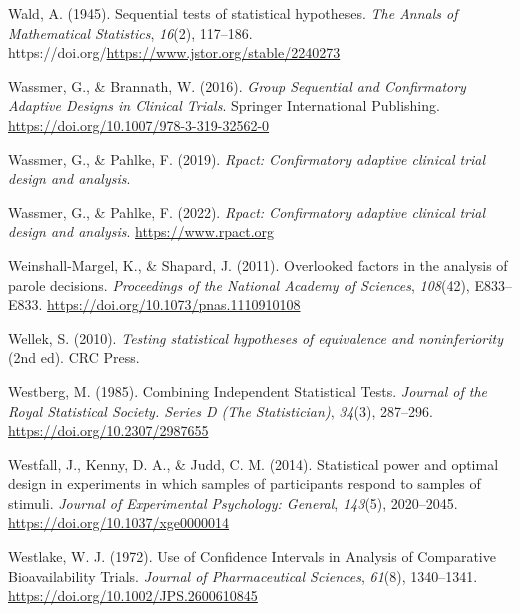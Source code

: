 \documentclass[
  oneside]{krantz}
\newlength{\cslhangindent}
\newlength{\cslentryspacingunit} %
\newenvironment{CSLReferences}[2] %
 {%
  \setlength{\parindent}{0pt}
  \ifodd #1
  \let\oldpar\par
  \def\par{\hangindent=\cslhangindent\oldpar}
  \fi
  \setlength{\parskip}{#2\cslentryspacingunit}
 }%
 {}
\begin{document}
\begin{CSLReferences}{1}{0}
\leavevmode{}%
Wald, A. (1945). Sequential tests of statistical hypotheses. \emph{The
Annals of Mathematical Statistics}, \emph{16}(2), 117--186.
https://doi.org/\url{https://www.jstor.org/stable/2240273}

\leavevmode{}%
Wassmer, G., \& Brannath, W. (2016). \emph{Group {Sequential} and
{Confirmatory Adaptive Designs} in {Clinical Trials}}. {Springer
International Publishing}.
\url{https://doi.org/10.1007/978-3-319-32562-0}

\leavevmode{}%
Wassmer, G., \& Pahlke, F. (2019). \emph{Rpact: {Confirmatory} adaptive
clinical trial design and analysis}.

\leavevmode{}%
Wassmer, G., \& Pahlke, F. (2022). \emph{Rpact: Confirmatory adaptive
clinical trial design and analysis}. \url{https://www.rpact.org}

\leavevmode{}%
Weinshall-Margel, K., \& Shapard, J. (2011). Overlooked factors in the
analysis of parole decisions. \emph{Proceedings of the National Academy
of Sciences}, \emph{108}(42), E833--E833.
\url{https://doi.org/10.1073/pnas.1110910108}

\leavevmode{}%
Wellek, S. (2010). \emph{Testing statistical hypotheses of equivalence
and noninferiority} (2nd ed). {CRC Press}.

\leavevmode{}%
Westberg, M. (1985). Combining {Independent Statistical Tests}.
\emph{Journal of the Royal Statistical Society. Series D (The
Statistician)}, \emph{34}(3), 287--296.
\url{https://doi.org/10.2307/2987655}

\leavevmode{}%
Westfall, J., Kenny, D. A., \& Judd, C. M. (2014). Statistical power and
optimal design in experiments in which samples of participants respond
to samples of stimuli. \emph{Journal of Experimental Psychology:
General}, \emph{143}(5), 2020--2045.
\url{https://doi.org/10.1037/xge0000014}

\leavevmode{}%
Westlake, W. J. (1972). Use of {Confidence Intervals} in {Analysis} of
{Comparative Bioavailability Trials}. \emph{Journal of Pharmaceutical
Sciences}, \emph{61}(8), 1340--1341.
\url{https://doi.org/10.1002/JPS.2600610845}


\end{CSLReferences}
\end{document}
